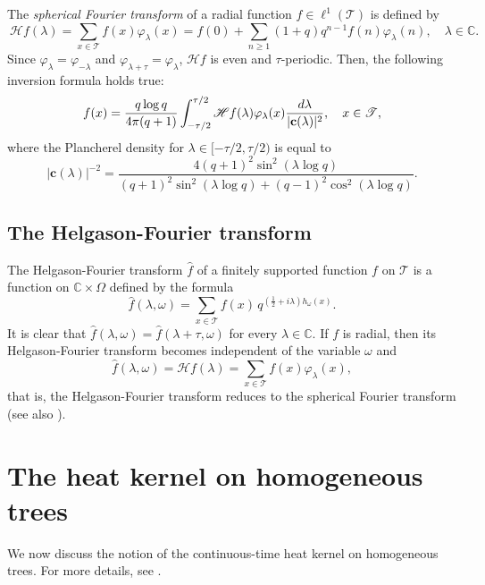 \documentclass[11pt,a4paper,reqno]{amsart}
\renewcommand\mathcal{\mathscr}
\theoremstyle{plain}
\theoremstyle{remark}
\theoremstyle{definition}
\theoremstyle{remark}
\numberwithin{equation}{section}
\def\int{\intop\nolimits}
\begin{document}
	
	The \textit{spherical Fourier transform} of a radial function $f\in \ell^1(\mathcal{T})$ is defined by
	\[\
	\mathcal{H}f(\lambda)=\sum\limits_{x\in \mathcal{T}}f(x)\varphi_\lambda(x)=f(0)+\sum\limits_{n\geq 1}(1+q)q^{n-1}f(n)\varphi_\lambda(n), \quad  \lambda \in \mathbb{C}.
	\]
	Since $\varphi_\lambda=\varphi_{-\lambda}$ and $\varphi_{\lambda+\tau}=\varphi_{\lambda}$, $\mathcal{H}f$ is even and $\tau$-periodic. Then, the following inversion formula holds true:
	\begin{equation*} 
		f(x)=\frac{q\log q}{4\pi(q+1)}\int_{-\tau /2}^{\tau /2}\mathcal{H}f(\lambda)\varphi_{\lambda}(x)\frac{d \lambda}{|\textbf{c}(\lambda)|^2}, \quad  x\in \mathcal{T},
	\end{equation*}		
	where the Plancherel density for $\lambda \in [-\tau/2, \tau/2)$ is equal to
	\begin{equation}\label{eq:Planchereldens}
		|\mathbf{c}(\lambda)|^{-2}=\frac{4(q+1)^2 \sin ^2(\lambda \log q)}{(q+1)^2 \sin ^2(\lambda \log q)+(q-1)^2 \cos ^2(\lambda \log q)}. 
	\end{equation}	


	
	\subsection{The Helgason-Fourier transform}
	The Helgason-Fourier transform $\widehat{f}$ of a finitely supported function $f$ on $\mathcal{T}$ is a function on $\mathbb{C} \times \Omega$ 
	defined by the formula
	\begin{equation}\label{eq:HFtransform}
	\widehat{f}(\lambda,\omega)=\sum_{x\in \mathcal{T}}f(x)\,q^{(\frac{1}{2}+i\lambda)h_{\omega}(x)}.
\end{equation}
	It is clear that $\widehat{f}(\lambda,\omega)=\widehat{f}(\lambda+\tau,\omega)$ for every $\lambda\in \mathbb{C}$. If $f$ is radial, then its Helgason-Fourier transform becomes independent of the variable $\omega$
	and
	$$\widehat{f}(\lambda,\omega)=\mathcal{H}f(\lambda)=\sum_{x\in \mathcal{T}}f(x)\varphi_{\lambda}(x),$$
	that is, the Helgason-Fourier transform reduces to the spherical Fourier transform (see also \cite[p.401]{CMS0}). 
	
	\section{The heat kernel on homogeneous trees}\label{sec:2}
	We now discuss the notion of the continuous-time heat kernel on homogeneous trees. For more details, see \cite{CMS, MedSe}.
\end{document}
